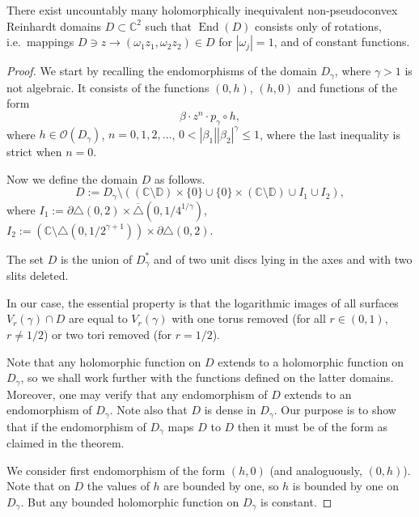 \documentclass[10pt,a4paper]{amsart}
\begin{document}
\begin{theorem}
\label{thm:counterexample}
There exist uncountably many holomorphically inequivalent non-pseudoconvex Reinhardt domains $D\subset\mathbb C^2$ such that $\operatorname{End}(D)$ consists only of rotations, i.e.\ mappings $D\owns z\to(\omega_1z_1,\omega_2z_2)\in D$ for $|\omega_j|=1$, and of constant functions.
\end{theorem}

\begin{proof} We start by recalling the endomorphisms of the domain $D_{\gamma}$, where $\gamma>1$ is not algebraic. It consists of the functions $(0,h)$, $(h,0)$ and functions of the form 
\begin{equation}\beta\cdot z^n\cdot p_{\gamma}\circ h,
\end{equation}
where $h\in\mathcal O(D_{\gamma})$, $n=0,1,2,\ldots$, $0<|\beta_1||\beta_2|^{\gamma}\leq 1$, where the last inequality is strict when $n=0$.

Now we define the domain $D$ as follows.
\begin{equation}
    D:=D_{\gamma}\setminus\left((\mathbb C\setminus\mathbb D)\times\{0\}\cup \{0\}\times(\mathbb C\setminus\mathbb D)\cup I_1\cup I_2\right),
    \end{equation}
    where $I_1:=\partial\triangle(0,2)\times \overline{\triangle}(0,1/4^{1/\gamma})$, $I_2:=(\mathbb C\setminus\triangle(0,1/2^{\gamma+1}))\times\partial\triangle(0,2)$.

The set $D$ is the union of $D_{\gamma}^*$ and of two unit discs lying in the axes and with two slits deleted. 

In our case, the essential property is that the logarithmic images of all surfaces $V_r(\gamma)\cap D$ are equal to $V_r(\gamma)$ with one torus removed (for all $r\in(0,1)$, $r\neq 1/2$) or two tori removed (for $r=1/2$).

Note that any holomorphic function on $D$ extends to a holomorphic function on $D_{\gamma}$, so we shall work further with the functions defined on the latter domains. Moreover, one may verify that any endomorphism of $D$ extends to an endomorphism of $D_{\gamma}$. Note also that $D$ is dense in $D_{\gamma}$. Our purpose is to show that if the endomorphism of $D_{\gamma}$ maps $D$ to $D$ then it must be of the form as claimed in the theorem.

We consider first endomorphism of the form $(h,0)$ (and analoguously, $(0,h)$). Note that on $D$ the values of $h$ are bounded by one, so $h$ is bounded by one on $D_{\gamma}$. But any bounded holomorphic function on $D_{\gamma}$ is constant.


\end{proof}
\end{document}
